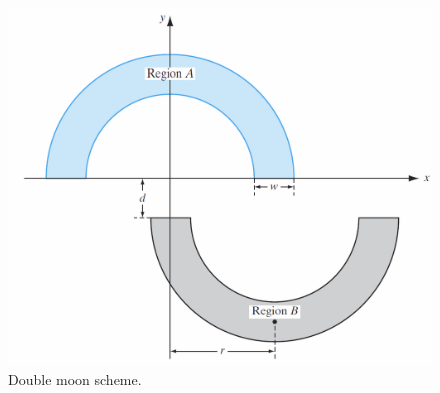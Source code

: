 \begin{figure}[!h]
\centering
\includegraphics[width=.6\columnwidth]{images/105doublemoon2}
\caption[Double moon scheme]{Double moon scheme.}
\label{fig:105doublemoon2}
\end{figure}